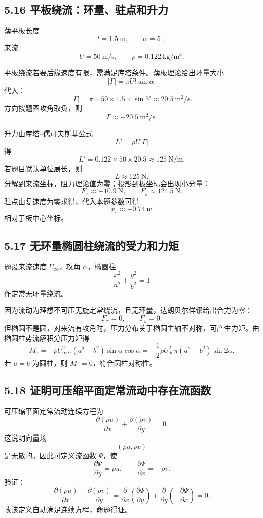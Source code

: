 ﻿\documentclass[UTF8,zihao=-4]{ctexart}
\begin{document}
\subsection*{5.16 平板绕流：环量、驻点和升力}

薄平板长度
\[
l=1.5\ \mathrm m,\qquad \alpha=5^\circ,
\]
来流
\[
U=50\ \mathrm{m/s},\qquad \rho=0.122\ \mathrm{kg/m^3}.
\]

平板绕流若要后缘速度有限，需满足库塔条件。薄板理论给出环量大小
\[
|\Gamma|=\pi U l\sin\alpha .
\]
代入：
\[
|\Gamma|=\pi\times50\times1.5\times\sin5^\circ
\approx20.5\ \mathrm{m^2/s}.
\]
方向按题图攻角取负，则
\[
\boxed{\Gamma\approx-20.5\ \mathrm{m^2/s}.}
\]

升力由库塔--儒可夫斯基公式
\[
L'=\rho U|\Gamma|
\]
得
\[
L'=0.122\times50\times20.5
\approx125\ \mathrm{N/m}.
\]
若题目默认单位展长，则
\[
\boxed{L\approx125\ \mathrm N.}
\]
分解到来流坐标，阻力理论值为零；投影到板坐标会出现小分量：
\[
F_x\approx-10.9\ \mathrm N,\qquad F_y\approx124.5\ \mathrm N .
\]
驻点由复速度为零求得，代入本题参数可得
\[
\boxed{x_s\approx-0.74\ \mathrm m}
\]
相对于板中心坐标。

\subsection*{5.17 无环量椭圆柱绕流的受力和力矩}

题设来流速度 \(U_\infty\)，攻角 \(\alpha\)，椭圆柱
\[
\frac{x^2}{a^2}+\frac{y^2}{b^2}=1
\]
作定常无环量绕流。

因为流动为理想不可压无旋定常绕流，且无环量，达朗贝尔佯谬给出合力为零：
\[
\boxed{F_x=0,\qquad F_y=0.}
\]
但椭圆不是圆，对来流有攻角时，压力分布关于椭圆主轴不对称，可产生力矩。由椭圆柱势流解积分压力矩得
\[
\boxed{
M_z=-\rho U_\infty^2\pi(a^2-b^2)\sin\alpha\cos\alpha
=-\frac12\rho U_\infty^2\pi(a^2-b^2)\sin2\alpha .}
\]
若 \(a=b\) 为圆柱，则 \(M_z=0\)，符合圆柱对称性。

\subsection*{5.18 证明可压缩平面定常流动中存在流函数}

可压缩平面定常流动连续方程为
\[
\frac{\partial(\rho u)}{\partial x}
+\frac{\partial(\rho v)}{\partial y}=0 .
\]
这说明向量场
\[
(\rho u,\rho v)
\]
是无散的。因此可定义流函数 \(\Psi\)，使
\[
\boxed{
\frac{\partial\Psi}{\partial y}=\rho u,\qquad
\frac{\partial\Psi}{\partial x}=-\rho v.}
\]
验证：
\[
\frac{\partial(\rho u)}{\partial x}
+\frac{\partial(\rho v)}{\partial y}
=
\frac{\partial}{\partial x}\left(\frac{\partial\Psi}{\partial y}\right)
+\frac{\partial}{\partial y}\left(-\frac{\partial\Psi}{\partial x}\right)
=0.
\]
故该定义自动满足连续方程，命题得证。
\end{document}
